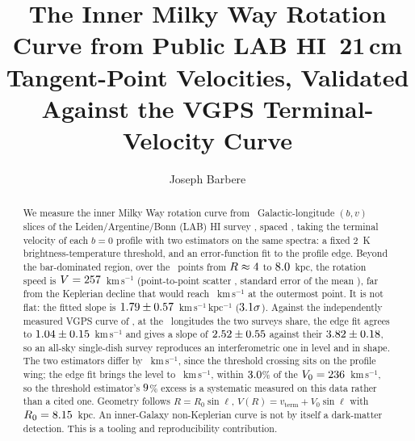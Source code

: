 \documentclass[twocolumn]{aastex631}
\begin{document}
\title{The Inner Milky Way Rotation Curve from Public LAB HI~21\,cm Tangent-Point
Velocities, Validated Against the VGPS Terminal-Velocity Curve}

\author[0009-0008-3289-4447]{Joseph Barbere}

\begin{abstract}
We measure the inner Milky Way rotation curve from \hiNlong\ Galactic-longitude $(b,v)$ slices of
the Leiden/Argentine/Bonn (LAB) HI survey \citep{kalberla2005}, spaced \hiStep\arcdeg, taking the
terminal velocity of each $b=0$ profile with two estimators on the same spectra: a fixed 2~K
brightness-temperature threshold, and an error-function fit to the profile edge. Beyond the
bar-dominated region, over the \hiRealNflat\ points from $R\approx4$ to
$8.0$~kpc, the rotation speed is $V=257$~km\,s$^{-1}$ (point-to-point scatter
\hiRealVflatScatter, standard error of the mean \hiRealVflatSem), far from the Keplerian decline
that would reach \hiRealKepler~km\,s$^{-1}$ at the outermost point. It is not flat: the fitted
slope is $1.79\pm0.57$~km\,s$^{-1}$\,kpc$^{-1}$ ($3.1\sigma$).
Against the independently measured VGPS curve of \citet{mccluregriffiths2016}, at the
\hiRealRefN\ longitudes the two surveys share, the edge fit agrees to
$1.04\pm0.15$~km\,s$^{-1}$ and gives a slope of
$2.52\pm0.55$ against their $3.82\pm0.18$, so
an all-sky single-dish survey reproduces an interferometric one in level and in shape. The two
estimators differ by \hiRealThrMinusEdge~km\,s$^{-1}$, since the threshold crossing sits on the
profile wing; the edge fit brings the level to \hiRealVflatEdge~km\,s$^{-1}$, within
$3.0$\% of the \citet{reid2019} $V_0=236$~km\,s$^{-1}$, so the threshold
estimator's $9$\% excess is a systematic measured on this data rather than a cited
one. Geometry follows $R = R_0\sin\ell$, $V(R) = v_\mathrm{term} + V_0\sin\ell$ with
$R_0=8.15$~kpc. An inner-Galaxy non-Keplerian curve is not by itself a dark-matter detection.
This is a tooling and reproducibility contribution.
\end{abstract}

\end{document}
